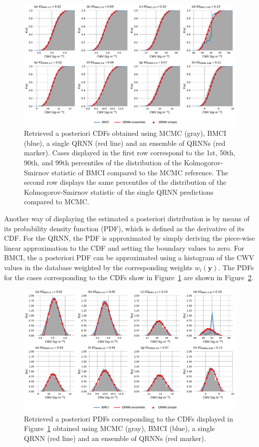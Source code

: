 \documentclass[journal abbreviation, manuscript]{copernicus}
\begin{document}
  \begin{figure}[hbtp!]
    \centering
    \includegraphics[width = 1.0\linewidth]{../plots/fig03}
    \caption{Retrieved a posteriori CDFs obtained using MCMC (gray), BMCI
    (blue), a single QRNN (red line) and an ensemble of QRNNs (red marker). Cases
    displayed in the first row correspond to the 1st, 50th, 90th, and 99th
    percentiles of the distribution of the Kolmogorov-Smirnov statistic of BMCI
    compared to the MCMC reference. The second row displays the same percentiles of
    the distribution of the Kolmogorov-Smirnov statistic of the single QRNN
    predictions compared to MCMC.}
    \label{fig:cdfs}
  \end{figure}

  Another way of displaying the estimated a posteriori distribution is by means
  of its probability density function (PDF), which is defined as the derivative
  of its CDF. For the QRNN, the PDF is approximated by simply deriving
  the piece-wise linear approximation to the CDF and setting the boundary values
  to zero. For BMCI, the a posteriori PDF can be approximated using a histogram of the
  CWV values in the database weighted by the corresponding weights $w_i(\mathbf{y})$.
  The PDFs for the cases corresponding to the CDFs show in
  Figure~\ref{fig:cdfs} are shown in Figure~\ref{fig:pdfs}.

  \begin{figure}[hbtp!]
    \centering
    \includegraphics[width = 1.0\linewidth]{../plots/fig04}
    \caption{Retrieved a posteriori PDFs corresponding to the CDFs displayed
      in Figure~\ref{fig:cdfs} obtained using MCMC (gray), BMCI (blue), a single
      QRNN (red line) and an ensemble of QRNNs (red marker).}
    \label{fig:pdfs}
  \end{figure}
\end{document}
